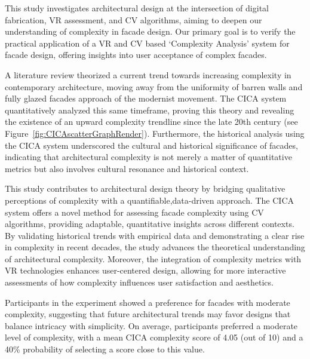 


This study investigates architectural design at the intersection of digital fabrication, VR assessment, and CV algorithms, aiming to deepen our understanding of complexity in facade design.
Our primary goal is to verify the practical application of a VR and CV based `Complexity Analysis' system for facade design, offering insights into user acceptance of complex facades.

A literature review theorized a current trend towards increasing complexity in contemporary architecture, moving away from the uniformity of barren walls and fully glazed facades approach of the modernist movement.
The CICA system quantitatively analyzed this same timeframe, proving this theory and revealing the existence of an upward complexity trendline since the late 20th century (see Figure~\ref{fig:CICAscatterGraphRender}).
Furthermore, the historical analysis using the CICA system underscored the cultural and historical significance of facades, indicating that architectural complexity is not merely a matter of quantitative metrics but also involves cultural resonance and historical context.

This study contributes to architectural design theory by bridging qualitative perceptions of complexity with a quantifiable,data-driven approach.
The CICA system offers a novel method for assessing facade complexity using CV algorithms, providing adaptable, quantitative insights across different contexts.
By validating historical trends with empirical data and demonstrating a clear rise in complexity in recent decades, the study advances the theoretical understanding of architectural complexity.
Moreover, the integration of complexity metrics with VR technologies enhances user-centered design, allowing for more interactive assessments of how complexity influences user satisfaction and aesthetics.

Participants in the experiment showed a preference for facades with moderate complexity, suggesting that future architectural trends may favor designs that balance intricacy with simplicity.
On average, participants preferred a moderate level of complexity, with a mean CICA complexity score of 4.05 (out of 10) and a 40\% probability of selecting a score close to this value.

